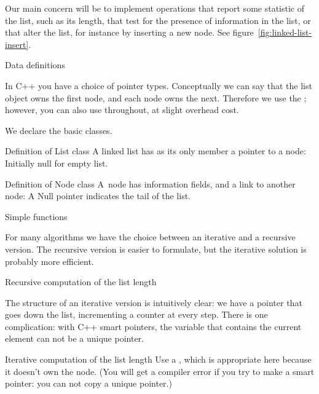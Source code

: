 Our main concern will be to implement operations that report some
statistic of the list, such as its length, that test for the presence
of information in the list, or that alter the list, for
instance by inserting a new node. See figure~\ref{fig:linked-list-insert}.

 {Data definitions}

In C++ you have a choice of pointer types. Conceptually we can say
that the list object owns the first node, and each node owns the
next. Therefore we use the ; however, you can
also use  throughout, at slight overhead cost.

We declare the basic classes.

\begin{block}{Definition of List class}
  \label{sl:list-class}
  A linked list has as its only member a pointer to a node:
  Initially null for empty list.
\end{block}

\begin{block}{Definition of Node class}
  \label{sl:node-class}
  A~node has information fields, and a
  link to another node:
  A Null pointer indicates the tail of the list.
\end{block}

 {Simple functions}

For many algorithms we have the choice between an iterative and a
recursive version. The recursive version is easier to formulate, but
the iterative solution is probably more efficient.

\begin{block}{Recursive computation of the list length}
  \label{sl:linkedlist-length-recur}
\end{block}

The structure of an iterative version is intuitively clear: we have a
pointer that goes down the list, incrementing a counter at every
step. There is one complication: 
with C++ smart pointers, the variable that contains the current
element can not be a unique pointer.

\begin{block}{Iterative computation of the list length}
  \label{sl:linkedlist-length-iter}
  Use a
  , which is appropriate here because it doesn't
  own the node.
  (You will get a compiler error if you try to make  a
  smart pointer: you can not copy a unique pointer.)
\end{block}


